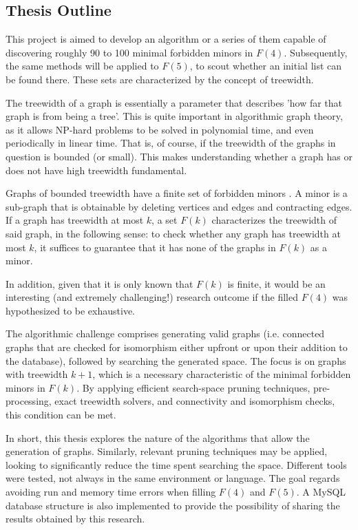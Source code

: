 \subsection{Thesis Outline}
This project is aimed to develop an algorithm or a series of them capable of discovering roughly 90 to 100 minimal forbidden minors in $F(4)$. Subsequently, the same methods will be applied to $F(5)$, to scout whether an initial list can be found there. These sets are characterized by the concept of treewidth.

The treewidth of a graph is essentially a parameter that describes 'how far that graph is from being a tree'. This is quite important in algorithmic graph theory, as it allows NP-hard problems to be solved in polynomial time, and even periodically in linear time. That is, of course, if the treewidth of the graphs in question is bounded (or small). This makes understanding whether a graph has or does not have high treewidth fundamental.

Graphs of bounded treewidth have a finite set of forbidden minors \cite{robertson2004wagners}. A minor is a sub-graph that is obtainable by deleting vertices and edges and contracting edges. If a graph has treewidth at most $k$, a set $F(k)$ characterizes the treewidth of said graph, in the following sense: to check whether any graph has treewidth at most $k$, it suffices to guarantee that it has none of the graphs in $F(k)$ as a minor. 

In addition, given that it is only known that $F(k)$ is finite, it would be an interesting (and extremely challenging!) research outcome if the filled $F(4)$ was hypothesized to be exhaustive. 

The algorithmic challenge comprises generating valid graphs (i.e. connected graphs that are checked for isomorphism either upfront or upon their addition to the database), followed by searching the generated space. The focus is on graphs with treewidth $k+1$, which is a necessary characteristic of the minimal forbidden minors in $F(k)$. By applying efficient search-space pruning techniques, pre-processing, exact treewidth solvers, and connectivity and isomorphism checks, this condition can be met.

In short, this thesis explores the nature of the algorithms that allow the generation of graphs. Similarly, relevant pruning techniques may be applied, looking to significantly reduce the time spent searching the space. Different tools were tested, not always in the same environment or language. The goal regards avoiding run and memory time errors when filling $F(4)$ and $F(5)$. A MySQL database structure is also implemented to provide the possibility of sharing the results obtained by this research. 

